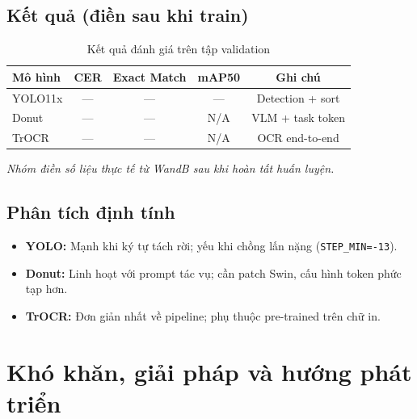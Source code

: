 \documentclass[a4paper,12pt]{report}
\begin{document}
\section{Kết quả (điền sau khi train)}
\begin{table}[H]
  \centering
  \caption{Kết quả đánh giá trên tập validation}
  \begin{tabular}{lcccc}
    \toprule
    \textbf{Mô hình} & \textbf{CER} & \textbf{Exact Match} & \textbf{mAP50} & \textbf{Ghi chú} \\
    \midrule
    YOLO11x & --- & --- & --- & Detection + sort \\
    Donut   & --- & --- & N/A & VLM + task token \\
    TrOCR   & --- & --- & N/A & OCR end-to-end \\
    \bottomrule
  \end{tabular}
\end{table}

\textit{Nhóm điền số liệu thực tế từ WandB sau khi hoàn tất huấn luyện.}

\section{Phân tích định tính}
\begin{itemize}[leftmargin=*]
  \item \textbf{YOLO:} Mạnh khi ký tự tách rời; yếu khi chồng lấn nặng (\texttt{STEP\_MIN=-13}).
  \item \textbf{Donut:} Linh hoạt với prompt tác vụ; cần patch Swin, cấu hình token phức tạp hơn.
  \item \textbf{TrOCR:} Đơn giản nhất về pipeline; phụ thuộc pre-trained trên chữ in.
\end{itemize}

\chapter{Khó khăn, giải pháp và hướng phát triển}
\end{document}
